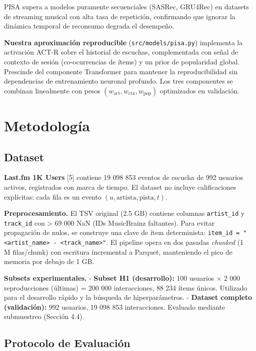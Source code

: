 \documentclass{article}
\begin{document}
PISA supera a modelos puramente secuenciales (SASRec, GRU4Rec) en datasets de streaming musical con alta tasa de repetición, confirmando que ignorar la dinámica temporal de reconsumo degrada el desempeño.

\textbf{Nuestra aproximación reproducible} (\texttt{src/models/pisa.py}) implementa la activación ACT-R sobre el historial de escuchas, complementada con señal de contexto de sesión (co-ocurrencias de ítems) y un prior de popularidad global. Prescinde del componente Transformer para mantener la reproducibilidad sin dependencias de entrenamiento neuronal profundo. Los tres componentes se combinan linealmente con pesos \((w_{\text{act}}, w_{\text{ctx}}, w_{\text{pop}})\) optimizados en validación.

\section{Metodología}\label{metodologuxeda}

\subsection{Dataset}\label{dataset}

\textbf{Last.fm 1K Users} {[}5{]} contiene 19 098 853 eventos de escucha de 992 usuarios activos, registrados con marca de tiempo. El dataset no incluye calificaciones explícitas: cada fila es un evento \((u, \text{artista}, \text{pista}, t)\).

\textbf{Preprocesamiento.} El TSV original (2.5 GB) contiene columnas \texttt{artist\_id} y \texttt{track\_id} con \textgreater{} 69 000 NaN (IDs MusicBrainz faltantes). Para evitar propagación de nulos, se construye una clave de ítem determinista: \texttt{item\_id\ =\ "\textless{}artist\_name\textgreater{}\ -\ \textless{}track\_name\textgreater{}"}. El pipeline opera en dos pasadas \emph{chunked} (1 M filas/chunk) con escritura incremental a Parquet, manteniendo el pico de memoria por debajo de 1 GB.

\textbf{Subsets experimentales.}
- \textbf{Subset H1 (desarrollo):} 100 usuarios $\times$ 2 000 reproducciones (últimas) = 200 000 interacciones, 88 234 ítems únicos. Utilizado para el desarrollo rápido y la búsqueda de hiperparámetros.
- \textbf{Dataset completo (validación):} 992 usuarios, 19 098 853 interacciones. Evaluado mediante submuestreo (Sección 4.4).

\subsection{Protocolo de Evaluación}\label{protocolo-de-evaluaciuxf3n}
\end{document}

